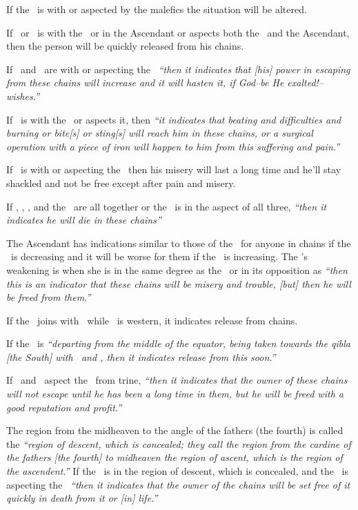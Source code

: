 If the \Moon\, is with or aspected by the malefics the situation will be altered.

If \Jupiter\, or \Venus\, is with the \Moon\, or in the Ascendant or aspects both the \Moon\, and the Ascendant, then the person will be quickly released from his chains.

If \Mercury\, and \Jupiter\, are with or aspecting the \Moon\,  \textsl{``then it indicates that [his] power in escaping from these chains will increase and it will hasten it, if God--be He exalted!--wishes.''}

If \Mars\, is with the \Moon\, or aspects it, then \textsl{``it indicates that beating and difficulties and burning or bite[s] or sting[s] will reach him in these chains, or a surgical operation with a piece of iron will happen to him from this suffering and pain.''}

If \Saturn\, is with or aspecting the \Moon\ then his misery will last a long time and he'll stay shackled and not be free except after pain and misery.

If \Mercury, \Saturn, \Mars, and the \Moon\, are all together or the \Moon\, is in the aspect of all three, \textsl{``then it indicates he will die in these chains''}

The Ascendant has indications similar to those of the \Moon\, for anyone in chains if the \Moon\, is decreasing and it will be worse for them if the \Moon\, is increasing. The \Moon's weakening is when she is in the same degree as the \Sun\, or in its opposition as \textsl{``then this is an indicator that these chains will be misery and trouble, [but] then he will be freed from them.''}

If the \Moon\, joins with \Mercury\, while \Mercury\, is western, it indicates release from chains. 

If the \Moon\, is \textsl{``departing from the middle of the equator, being taken towards the qibla [the South] with \Mercury\, and \Venus, then it indicates release from this soon.''}

If \Saturn\, and \Jupiter\, aspect the \Moon\, from trine, \textsl{``then it indicates that the owner of these chains will not escape until he has been a long time in them, but he will be freed with a good reputation and profit.''}

The region from the midheaven to the angle of the fathers (the fourth) is called the \textsl{``region of descent, which is concealed; they call the region from the cardine of the fathers [the fourth] to midheaven the region of ascent, which is the region of the ascendent.''} If the \Moon\, is in the region of descent, which is concealed, and the \Mars\, is aspecting the \Moon\, \textsl{``then it indicates that the owner of the chains will be set free of it quickly in death from it or [in] life.''}

